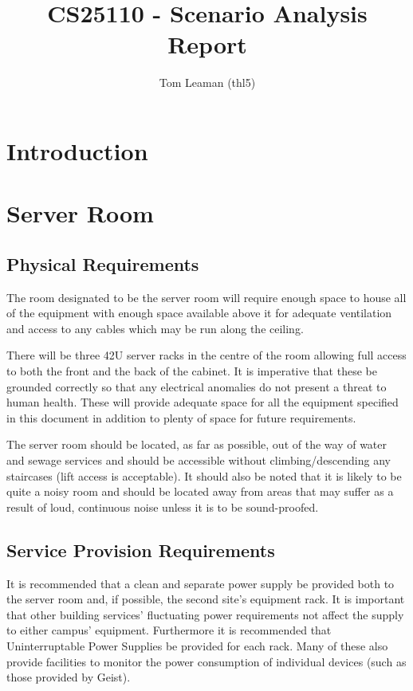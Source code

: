 \documentclass[a4paper, twoside]{article}
\title{CS25110 - Scenario Analysis Report}
\author{Tom Leaman (thl5)}
\begin{document}
\maketitle
\newpage
\tableofcontents
\newpage

\section{Introduction}

\section{Server Room}
\subsection{Physical Requirements}
The room designated to be the server room will require enough space to house all
of the equipment with enough space available above it for adequate ventilation
and access to any cables which may be run along the ceiling.

There will be three 42U server racks in the centre of the room allowing full access
to both the front and the back of the cabinet. It is imperative that these be
grounded correctly so that any electrical anomalies do not present a threat to
human health. These will provide adequate space for all the equipment specified
in this document in addition to plenty of space for future requirements.

The server room should be located, as far as possible, out of the way of water
and sewage services and should be accessible without climbing/descending any
staircases (lift access is acceptable). It should also be noted that it is
likely to be quite a noisy room and should be located away from areas that may
suffer as a result of loud, continuous noise unless it is to be sound-proofed.

\subsection{Service Provision Requirements}
It is recommended that a clean and separate power supply be provided both to the
server room and, if possible, the second site's equipment rack. It is important
that other building services' fluctuating power requirements not affect the
supply to either campus' equipment. Furthermore it is recommended that
Uninterruptable Power Supplies be provided for each rack. Many of these also
provide facilities to monitor the power consumption of individual devices (such
as those provided by Geist).
\end{document}
